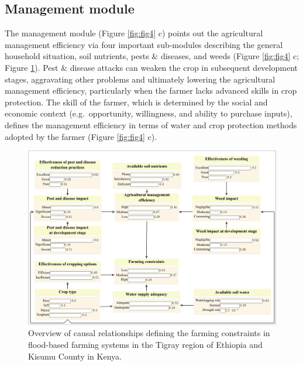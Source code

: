 \documentclass[]{elsarticle} %
\begin{document}
\hypertarget{ref45}{%
\subsection{Management module}\label{ref45}}

The management module (Figure \ref{fig:fig4} c) points out the agricultural management efficiency via four important sub-modules describing the general household situation, soil nutrients, pests \& diseases, and weeds (Figure \ref{fig:fig4} c; Figure \ref{fig:fig9}). Pest \& disease attacks can weaken the crop in subsequent development stages, aggravating other problems and ultimately lowering the agricultural management efficiency, particularly when the farmer lacks advanced skills in crop protection. The skill of the farmer, which is determined by the social and economic context (e.g.~opportunity, willingness, and ability to purchase inputs), defines the management efficiency in terms of water and crop protection methods adopted by the farmer (Figure \ref{fig:fig4} c).

\begin{figure}[!h]

{\centering \includegraphics[width=1\linewidth,]{Modelling_FBFS_files/figure-latex/fig9-plot-1} 

}

\caption{Overview of causal relationships defining the farming constraints in flood-based farming systems in the Tigray region of Ethiopia and Kisumu County in Kenya.}\label{fig:fig9}
\end{figure}
\end{document}
